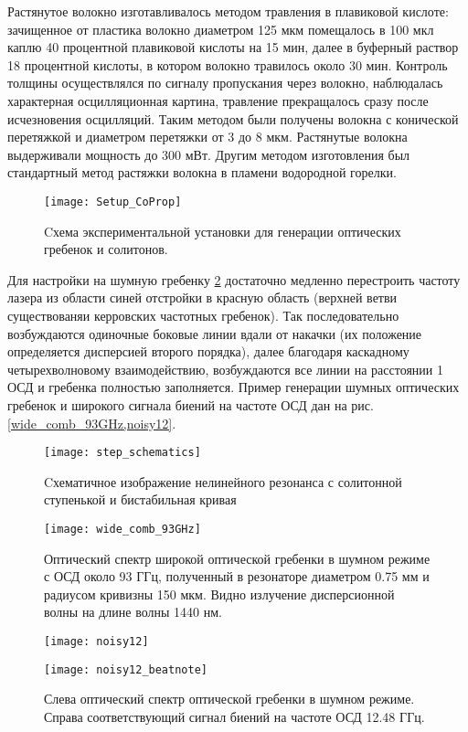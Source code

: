 Растянутое волокно изготавливалось методом травления в плавиковой кислоте: зачищенное от пластика волокно диаметром 125 мкм помещалось в 100 мкл каплю 40 процентной плавиковой кислоты на 15 мин, далее в буферный раствор 18 процентной кислоты, в котором волокно травилось около 30 мин. Контроль толщины осуществлялся по сигналу пропускания через волокно, наблюдалась характерная осцилляционная картина, травление прекращалось сразу после исчезновения осцилляций. Таким методом были получены волокна с конической перетяжкой и диаметром перетяжки от 3 до 8 мкм. Растянутые волокна выдерживали мощность до 300 мВт. Другим методом изготовления был стандартный метод растяжки волокна в пламени водородной горелки.

\begin{figure}[ht]
\centering
  \texttt{[image: Setup\_CoProp]}
  \caption{Cхема экспериментальной установки для генерации оптических гребенок и солитонов.}
  \label{Setup_CoProp}
\end{figure}

Для настройки на шумную гребенку \ref{step_schematics} достаточно медленно перестроить частоту лазера из области синей отстройки в красную область (верхней ветви существованяи керровских частотных гребенок). Так последовательно возбуждаются одиночные боковые линии вдали от накачки (их положение определяется дисперсией второго порядка), далее благодаря каскадному четырехволновому взаимодействию, возбуждаются все линии на расстоянии 1 ОСД и гребенка полностью заполняется. Пример генерации шумных оптических гребенок и широкого сигнала биений на частоте ОСД дан на рис. \ref{wide_comb_93GHz,noisy12}.

\begin{figure}[ht]
\centering
  \texttt{[image: step\_schematics]}
  \caption{Cхематичное изображение нелинейного резонанса с солитонной ступенькой и бистабильная кривая}
  \label{step_schematics}
\end{figure}

\begin{figure}[ht]
\centering
  \texttt{[image: wide\_comb\_93GHz]}
  \caption{Оптический спектр широкой оптической гребенки в шумном режиме с ОСД около 93 ГГц, полученный в резонаторе диаметром 0.75 мм и радиусом кривизны 150 мкм. Видно излучение дисперсионной волны на длине волны 1440 нм.}
  \label{wide_comb_93GHz}
\end{figure}

\begin{figure}[ht]
  \begin{minipage}[ht]{0.49\linewidth}\centering
    \texttt{[image: noisy12]}
  \end{minipage}
  \hfill
  \begin{minipage}[ht]{0.49\linewidth}\centering
    \texttt{[image: noisy12\_beatnote]}
  \end{minipage}
  \caption{Слева оптический спектр оптической гребенки в шумном режиме. Справа соответствующий сигнал биений на частоте ОСД 12.48 ГГц.}
  \label{noisy12}
\end{figure}

